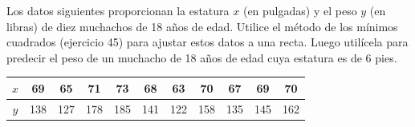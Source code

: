 \item Los datos siguientes proporcionan la estatura $x$ (en pulgadas) y el peso $y$ (en libras) de diez muchachos de 18 años de edad. Utilice el método de los mínimos cuadrados (ejercicio 45) para ajustar estos datos a una recta. Luego utilícela para predecir el peso de un muchacho de 18 años de edad cuya estatura es de 6 pies.

\begin{center}
\begin{tabular}{|c|c|c|c|c|c|c|c|c|c|c|}
\hline
$x$ & 69 & 65 & 71 & 73 & 68 & 63 & 70 & 67 & 69 & 70 \\
\hline
$y$ & 138 & 127 & 178 & 185 & 141 & 122 & 158 & 135 & 145 & 162 \\
\hline
\end{tabular}
\end{center}
